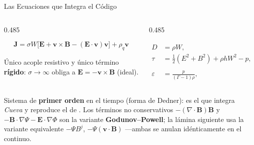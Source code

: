 \documentclass[aspectratio=169,9pt]{beamer}
\begin{document}
\begin{frame}{Las Ecuaciones que Integra el C\'odigo}
\vspace{0.12cm}
\pause
\begin{columns}[T]
\begin{column}{0.485\textwidth}
  \begin{tcolorbox}[RES={Cierre resistivo --- ley de Ohm relativista}]
    \footnotesize
    \vspace{0.04cm}
    \[
      \mathbf{J}=\sigma W\bigl[\mathbf{E}+\mathbf{v}\times\mathbf{B}
      -(\mathbf{E}\!\cdot\!\mathbf{v})\mathbf{v}\bigr]+\rho_q\mathbf{v}
    \]
    \vspace{-0.32cm}
    \begin{center}{\tiny\color{INF2}
      \'Unico acople resistivo y \'unico t\'ermino \textbf{r\'igido}:
      $\sigma\to\infty$ obliga a $\mathbf{E}=-\mathbf{v}\times\mathbf{B}$ (ideal).}
    \end{center}
  \end{tcolorbox}
\end{column}
\begin{column}{0.485\textwidth}
  \begin{tcolorbox}[HYP={Variables conservadas y ecuaci\'on de estado}]
    \footnotesize
    \vspace{0.04cm}
    \[
      \begin{aligned}
        D      &= \rho W,
          &\quad \mathbf{S} &= \rho h W^2\mathbf{v}+\mathbf{E}\times\mathbf{B},\\
        \tau   &= \tfrac12(E^2\!+\!B^2)+\rho h W^2-p,
          &\quad \rho h     &= \rho(1+\varepsilon)+p,\\
        \varepsilon &= \tfrac{p}{(\Gamma-1)\rho},
          &\quad W          &= (1-v^2)^{-1/2}
      \end{aligned}
    \]
    \vspace{-0.30cm}
  \end{tcolorbox}
\end{column}
\end{columns}

\vspace{0.10cm}
\pause
\begin{center}
  {\scriptsize\color{INF2}
   Sistema de \textbf{primer orden} en el tiempo (forma de Dedner): es el que
   integra \textit{Cueva} y reproduce el de \citet{miranda2014,miranda-aranguren-2018}.
   Los t\'erminos no conservativos $-(\nabla\!\cdot\!\mathbf B)\mathbf B$ y
   $-\mathbf B\!\cdot\!\nabla\Psi-\mathbf E\!\cdot\!\nabla\Phi$ son la variante
   \textbf{Godunov--Powell}; la l\'amina siguiente usa la variante equivalente
   $-\Psi B^j$, $-\Psi(\mathbf v\!\cdot\!\mathbf B)$ \citep{ruedaramirez2023}
   ---ambas se anulan id\'enticamente en el continuo.}
\end{center}
\end{frame}
\end{document}
